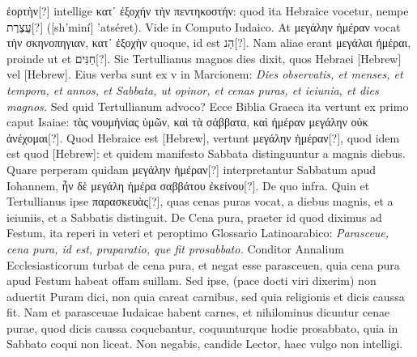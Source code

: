 \textgreek{ἑορτὴν}[?]
 intellige
\textgreek{κατ᾽ ἐξοχήν τὴν πεντηκοστήν}:
 quod ita Hebraice vocetur, nempe \texthebrew{עֲצֶרֶת}[?] ([sh'miní] 'atséret).
Vide in Computo Iudaico.
At \textgreek{μεγάλην ἡμέραν}
 vocat \textgreek{τὴν σκηνοπηγιαν, κατ᾽ ἐξοχὴν}
 quoque, id est \texthebrew{הַנ}[?].
Nam aliae erant \textgreek{μεγάλαι ἡμέραι},
proinde ut et \texthebrew{חַנִּים}[?].
Sic Tertullianus magnos dies dixit, quos
Hebraei \texthebrew{}[Hebrew] vel \texthebrew{}[Hebrew].
Eius verba sunt ex v in Marcionem:
\textit{Dies observatis, et menses, et tempora, et annos, et Sabbata, ut opinor,
et cenas puras, et ieiunia, et dies magnos.}
Sed quid Tertullianum
advoco?
Ecce Biblia Graeca ita vertunt ex primo caput Isaiae:
\textgreek{τὰς νουμἠνίας ὑμῶν, καὶ τὰ σάββατα,
 καὶ ἡμέραν μεγάλην οὐκ ἀνέχομαι}[?].
Quod Hebraice est \texthebrew{}[Hebrew],
 vertunt \textgreek{μεγάλην ἡμέραν[?]}, quod idem
est quod \texthebrew{}[Hebrew]: et quidem manifesto Sabbata distinguuntur a
magnis diebus. 
Quare perperam quidam \textgreek{μεγάλην ἡμέραν[?]} interpretantur
Sabbatum apud Iohannem, \textgreek{ἦν δὲ μεγάλη ἡμέρα σαββάτου
ἐκείνου[?]}.
De quo infra.
Quin et Tertullianus ipse \textgreek{παρασκευὰς[?]},
quas cenas puras vocat, a diebus magnis, et a ieiuniis, et a
Sabbatis distinguit.
De Cena pura, praeter id quod diximus ad
Festum, ita reperi in veteri et peroptimo Glossario Latinoarabico:
\textit{Parasceue, cena pura, id est, praparatio, que fit prosabbato.}
Conditor Annalium Ecclesiasticorum turbat de cena
pura, et negat esse parasceuen, quia cena pura apud Festum
habeat offam suillam.
Sed ipse, (pace docti viri dixerim) non
aduertit Puram dici, non quia careat carnibus, sed quia religionis
et dicis caussa fit.
Nam et parasceuae Iudaicae habent carnes,
et nihilominus dicuntur cenae purae, quod dicis caussa coquebantur,
coquunturque hodie prosabbato, quia in Sabbato
coqui non liceat.
Non negabis, candide Lector, haec vulgo non intelligi.

